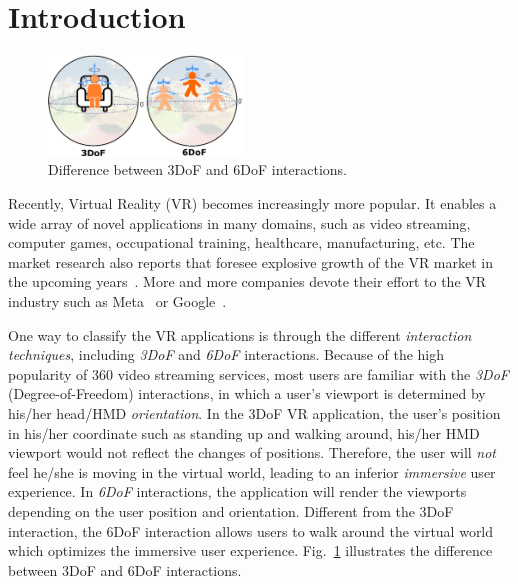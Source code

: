 \section{Introduction} \label{sec:intro}

\begin{figure}[tbh]
    \centering
    \includegraphics[width=0.46\textwidth]{figs/vr_phase.eps}
    \caption{Difference between 3DoF and 6DoF interactions.}
    \label{fig:vr_phase}
\end{figure}

Recently, Virtual Reality (VR) becomes increasingly more popular.
It enables a wide array of novel applications in many domains, such as video streaming, computer games, occupational training, healthcare, manufacturing, etc.
The market research also reports that foresee explosive growth of the VR market in the upcoming years~\cite{XR_market}.
More and more companies devote their effort to the VR industry such as Meta~\cite{Meta} or Google~\cite{google_AR_VR, MJRD+20}.

One way to classify the VR applications is through the different {\em interaction techniques}, including {\em 3DoF} and {\em 6DoF} interactions.
Because of the high popularity of 360{\degree} video streaming services, most users are familiar with the {\em 3DoF} (Degree-of-Freedom) interactions, in which a user's viewport is determined by his/her head/HMD {\em orientation}.
In the 3DoF VR application, the user's position in his/her coordinate such as standing up and walking around, his/her HMD viewport would not reflect the changes of positions.
Therefore, the user will {\em not} feel he/she is moving in the virtual world, leading to an inferior {\em immersive} user experience.
In {\em 6DoF} interactions, the application will render the viewports depending on the user position and orientation. 
Different from the 3DoF interaction, the 6DoF interaction allows users to walk around the virtual world which optimizes the immersive user experience.
Fig.~\ref{fig:vr_phase} illustrates the difference between 3DoF and 6DoF interactions.

